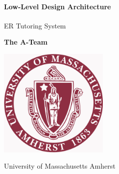 \begin{titlepage}
    \begin{center}
        \vspace*{1cm}
        
 
        \HRule \\[0.4cm]
        {   \huge\textbf{Low-Level Design Architecture}\\[0.4cm] }
        \HRule \\[1cm]
       
        
        \vspace{0.5cm}
        \LARGE
        ER Tutoring System
        
        \vspace{1.5cm}
        
        \textbf{The A-Team}
        
        \vfill

        \vspace{0.8cm}
        
        \includegraphics[width=0.4\textwidth]{UMASS_logo}
        
        \Large
University of Massachusetts Amherst
        
    \end{center}
\end{titlepage}
